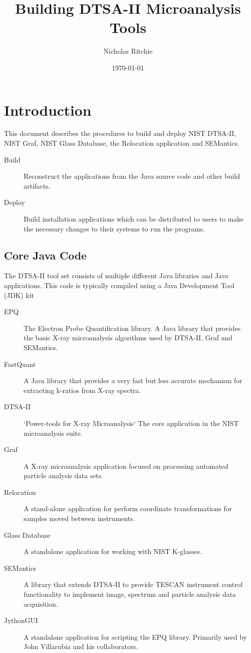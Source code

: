 \documentclass{article}
\title{Building DTSA-II Microanalysis Tools}
\author{Nicholas Ritchie}
\date{\today}
\begin{document}
\maketitle

\section{Introduction}
This document describes the procedures to build and deploy NIST DTSA-II, NIST Graf, NIST Glass Database, the Relocation application and SEMantics.

\begin{description}
    \item[Build] Reconstruct the applications from the Java source code and other build artifacts.
    \item[Deploy] Build installation applications which can be distributed to users to make the necessary changes to their systems to run the programs.
\end{description}

\subsection{Core Java Code}
The DTSA-II tool set consists of multiple different Java libraries and Java applications.  This code is typically compiled using a Java Development Tool (JDK) kit

\begin{description}
    \item[EPQ] The Electron Probe Quantification library.  A Java library that provides the basic X-ray microanalysis algorithms used by DTSA-II, Graf and SEMantics.
    \item[FastQuant] A Java library that provides a very fast but less accurate mechanism for extracting k-ratios from X-ray spectra.
    \item[DTSA-II] `Power-tools for X-ray Microanalysis` The core application in the NIST microanalysis suite.
    \item[Graf] A X-ray microanalysis application focused on processing automated particle analysis data sets.
    \item[Relocation] A stand-alone application for perform coordinate transformations for samples moved between instruments.
    \item[Glass Database] A standalone application for working with NIST K-glasses.
    \item[SEMantics] A library that extends DTSA-II to provide TESCAN instrument control functionality to implement image, spectrum and particle analysis data acquisition.
    \item[JythonGUI] A standalone application for scripting the EPQ library.  Primarily used by John Villarubia and his collaborators.
\end{description}
\end{document}
